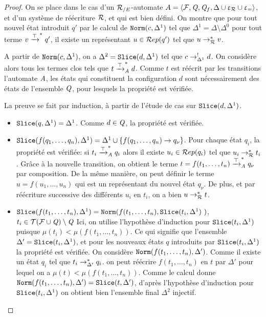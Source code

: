 \begin{proof}
  On se place dans le cas d'un ${\mathcal R_{/E}}$-automate $A = \langle \mathcal{F}, \mathit Q, \mathit Q_f, \Delta \cup \upvarepsilon_{\mathcal R} \cup \upvarepsilon_{=}\rangle$, et d'un système de réécriture $\mathcal R$,
  et qui est bien défini.
  On montre que pour tout nouvel état introduit $q'$  par le calcul de $\mathtt{Norm}(c, \Delta^1)$ tel que $\Delta^1 = \Delta \setminus \Delta^0$
  pour tout terme $v \xrightarrow{\top}^* q'$, il existe un représentant $u \in \mathcal R ep(q')$ tel que $u \rightarrow^*_\mathcal R v$.

  A partir de $\mathtt{Norm}(c, \Delta^1)$, on a $\Delta^2 = \mathtt{Slice}(d, \Delta^1)$ tel que $c \rightarrow^!_{\Delta^1} d$.
  On considère alors tous les termes clos tels que $t \xrightarrow{\top}^*_\mathit A d$. Comme $t$ est réécrit par les transitions 
  l'automate $\mathit A$, les états qui constituent la configuration $d$ sont nécessairement des états de l'ensemble $\mathit Q$,
  pour lesquels la propriété est vérifiée.
  
  La preuve se fait par induction, à partir de l'étude de cas sur $\mathtt{Slice}(d, \Delta^1)$. 
  \begin{itemize}
  \item $\mathtt{Slice}(q, \Delta^1) = \Delta^1$. Comme $d \in \mathit Q$, la propriété est vérifiée.

  \item $\mathtt{Slice}(f(q_1, \dots, q_n), \Delta^1) = \Delta^1 \cup \{ f(q_1, \dots, q_n) \rightarrow q_\nu\}$. 
    Pour chaque état $q_i$, la propriété est vérifiée: si $t_i \xrightarrow{\top}^*_\mathit A q_i$ alors il existe $u_i \in \mathcal R ep(q_i)$
    tel que $u_i \rightarrow_\mathcal R^* t_i$. Grâce à la nouvelle transition, on obtient le terme $t = f(t_1, \dots, t_n) \xrightarrow{\top}^*_\mathit A q_\nu$ par composition.
    De la même manière, on peut définir le terme $u = f(u_1, \dots, u_n)$ qui est un représentant du nouvel état $q_\nu$.
    De plus, et par réécriture successive des différents $u_i$ en $t_i$, on a bien $u \rightarrow^*_\mathcal R t$.

  \item $\mathtt{Slice}(f(t_1, \dots, t_n), \Delta^1) = \mathtt{Norm}(f(t_1,\dots, t_n), \mathtt{Slice}(t_i, \Delta^1)\ )$, $t_i \in \mathcal{ T(F \cup \mathit Q)} \setminus \mathit Q$
    Ici, on utilise l'hypothèse d'induction pour $\mathtt{Slice}(t_i, \Delta^1)$ puisque $\mu (t_i) < \mu(f(t_1, \dots, t_n))$.
    Ce qui signifie que l'ensemble $\Delta' = \mathtt{Slice}(t_i, \Delta^1)$, et pour les nouveaux états $q$ introduits par $\mathtt{Slice}(t_i, \Delta^1)$
    la propriété est vérifiée.
    On considère $\mathtt{Norm}(f(t_1,\dots, t_n), \Delta')$. Comme il existe un état $q_i$ tel que $t_i \rightarrow^*_{\Delta'} q_i$. on peut 
    réécrire $f(t_1,\dots, t_n)$ en $t$ par $\Delta'$ pour lequel on a $\mu (t) < \mu(f(t_1, \dots, t_n))$. Comme 
    le calcul donne $\mathtt{Norm}(f(t_1,\dots, t_n), \Delta') = \mathtt{Slice}(t, \Delta')$, d'après l'hypothèse d'induction 
    pour $\mathtt{Slice}(t_i, \Delta^1)$ on obtient bien l'ensemble final $\Delta^2$ injectif.
  \end{itemize}
\end{proof}


